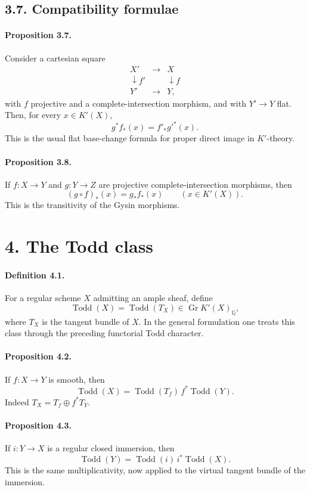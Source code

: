 \documentclass[11pt]{article}
\theoremstyle{plain}
\theoremstyle{definition}
\theoremstyle{remark}
\newcommand{\QQ}{\mathbb Q}
\DeclareMathOperator{\Gr}{Gr}
\providecommand{\Todd}{\operatorname{Todd}}
\begin{document}
\subsection*{3.7. Compatibility formulae}

\paragraph{Proposition 3.7.}
Consider a cartesian square
\[
\begin{array}{ccc}
X'&\longrightarrow&X\\
\downarrow f'&&\downarrow f\\
Y'&\longrightarrow&Y,
\end{array}
\]
with $f$ projective and a complete-intersection morphism, and with $Y'\to Y$ flat. Then, for every $x\in K'(X)$,
\[
 g^*f_*(x)=f'_*g'^*(x).
\]
This is the usual flat base-change formula for proper direct image in $K'$-theory.

\paragraph{Proposition 3.8.}
If $f:X\to Y$ and $g:Y\to Z$ are projective complete-intersection morphisms, then
\[
 (g\circ f)_*(x)=g_*f_*(x)\qquad (x\in K'(X)).
\]
This is the transitivity of the Gysin morphisms.

\section*{4. The Todd class}

\paragraph{Definition 4.1.}
For a regular scheme $X$ admitting an ample sheaf, define
\[
\Todd(X)=\Todd(T_X)\in \Gr K'(X)_\QQ,
\]
where $T_X$ is the tangent bundle of $X$. In the general formulation one treats this class through the preceding functorial Todd character.

\paragraph{Proposition 4.2.}
If $f:X\to Y$ is smooth, then
\[
\Todd(X)=\Todd(T_f)\,f^*\Todd(Y).
\]
Indeed $T_X=T_f\oplus f^*T_Y$.

\paragraph{Proposition 4.3.}
If $i:Y\to X$ is a regular closed immersion, then
\[
\Todd(Y)=\Todd(i)\,i^*\Todd(X).
\]
This is the same multiplicativity, now applied to the virtual tangent bundle of the immersion.
\end{document}
